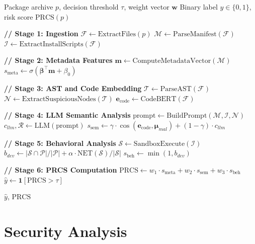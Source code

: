 \documentclass[conference]{IEEEtran}
\begin{document}
\begin{algorithm}[htbp]
\caption{LLM-Sentry Detection Pipeline}
\label{alg:llmsentry}
\begin{algorithmic}[1]
\REQUIRE Package archive $p$, decision threshold $\tau$, weight vector $\mathbf{w}$
\ENSURE Binary label $\hat{y} \in \{0,1\}$, risk score $\text{PRCS}(p)$

\STATE \textbf{// Stage 1: Ingestion}
\STATE $\mathcal{F} \leftarrow \text{ExtractFiles}(p)$
\STATE $\mathcal{M} \leftarrow \text{ParseManifest}(\mathcal{F})$
\STATE $\mathcal{I} \leftarrow \text{ExtractInstallScripts}(\mathcal{F})$

\STATE \textbf{// Stage 2: Metadata Features}
\STATE $\mathbf{m} \leftarrow \text{ComputeMetadataVector}(\mathcal{M})$
\STATE $s_{\text{meta}} \leftarrow \sigma(\boldsymbol{\beta}^\top \mathbf{m} + \beta_0)$

\STATE \textbf{// Stage 3: AST and Code Embedding}
\STATE $\mathcal{T} \leftarrow \text{ParseAST}(\mathcal{F})$
\STATE $\mathcal{N} \leftarrow \text{ExtractSuspiciousNodes}(\mathcal{T})$
\STATE $\mathbf{e}_{\text{code}} \leftarrow \text{CodeBERT}(\mathcal{F})$

\STATE \textbf{// Stage 4: LLM Semantic Analysis}
\STATE $\text{prompt} \leftarrow \text{BuildPrompt}(\mathcal{M}, \mathcal{I}, \mathcal{N})$
\STATE $c_{llm}, \mathcal{R} \leftarrow \text{LLM}(\text{prompt})$
\STATE $s_{\text{sem}} \leftarrow \gamma \cdot \cos(\mathbf{e}_{\text{code}}, \boldsymbol{\mu}_{mal}) + (1-\gamma) \cdot c_{llm}$

\STATE \textbf{// Stage 5: Behavioral Analysis}
\STATE $\mathcal{S} \leftarrow \text{SandboxExecute}(\mathcal{I})$
\STATE $b_{dev} \leftarrow |\mathcal{S} \cap \mathcal{P}| / |\mathcal{P}| + \alpha \cdot \text{NET}(\mathcal{S}) / |\mathcal{S}|$
\STATE $s_{\text{beh}} \leftarrow \min(1, b_{dev})$

\STATE \textbf{// Stage 6: PRCS Computation}
\STATE $\text{PRCS} \leftarrow w_1 \cdot s_{\text{meta}} + w_2 \cdot s_{\text{sem}} + w_3 \cdot s_{\text{beh}}$
\STATE $\hat{y} \leftarrow \mathbf{1}[\text{PRCS} > \tau]$

\RETURN $\hat{y}$, $\text{PRCS}$
\end{algorithmic}
\end{algorithm}

\section{Security Analysis}
\label{sec:security}
\end{document}
